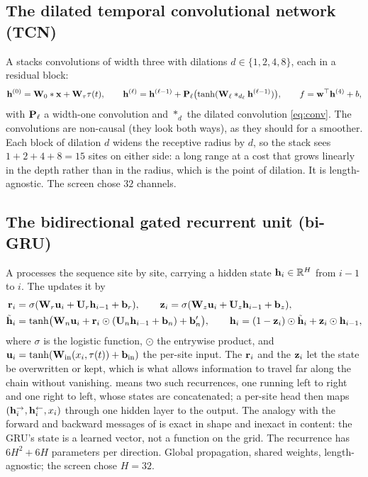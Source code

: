 \subsection{The dilated temporal convolutional network (TCN)}

A  stacks convolutions of width three with
dilations $d\in\{1,2,4,8\}$, each in a residual block:
\begin{equation}
  \mathbf{h}^{(0)}=\mathbf{W}_0\ast\mathbf{x}+\mathbf{W}_\tau\tau(t),\qquad
  \mathbf{h}^{(\ell)}=\mathbf{h}^{(\ell-1)}+\mathbf{P}_\ell\bigl(\tanh(\mathbf{W}_\ell\ast_{d_\ell}\mathbf{h}^{(\ell-1)})\bigr),\qquad
  f=\mathbf{w}^\top\mathbf{h}^{(4)}+b,
\end{equation}
with $\mathbf{P}_\ell$ a width-one convolution and $\ast_{d}$ the dilated convolution
\cref{eq:conv}. The convolutions are non-causal (they look both ways), as they should
for a smoother. Each block of dilation $d$ widens the receptive radius by $d$, so the
stack sees $1+2+4+8=15$ sites on either side: a long range at a cost that grows linearly
in the depth rather than in the radius, which is the point of dilation. It is
length-agnostic. The screen chose $32$ channels.

\subsection{The bidirectional gated recurrent unit (bi-GRU)}

A  processes the sequence site by site, carrying a hidden state
$\mathbf{h}_i\in\mathbb{R}^H$ from $i-1$ to $i$. The  updates it by
\begin{equation}
\begin{aligned}
  \mathbf{r}_i&=\sigma(\mathbf{W}_r\mathbf{u}_i+\mathbf{U}_r\mathbf{h}_{i-1}+\mathbf{b}_r),\qquad
  \mathbf{z}_i=\sigma(\mathbf{W}_z\mathbf{u}_i+\mathbf{U}_z\mathbf{h}_{i-1}+\mathbf{b}_z),\\
  \tilde{\mathbf{h}}_i&=\tanh\bigl(\mathbf{W}_n\mathbf{u}_i+\mathbf{r}_i\odot(\mathbf{U}_n\mathbf{h}_{i-1}+\mathbf{b}_n)+\mathbf{b}_n'\bigr),\qquad
  \mathbf{h}_i=(1-\mathbf{z}_i)\odot\tilde{\mathbf{h}}_i+\mathbf{z}_i\odot\mathbf{h}_{i-1},
\end{aligned}
\end{equation}
where $\sigma$ is the logistic function, $\odot$ the entrywise product, and
$\mathbf{u}_i=\tanh(\mathbf{W}_{\mathrm{in}}(x_i,\tau(t))+\mathbf{b}_{\mathrm{in}})$ the per-site
input. The  $\mathbf{r}_i$ and the  $\mathbf{z}_i$ let the
state be overwritten or kept, which is what allows information to travel far along the
chain without vanishing.  means two such recurrences, one running
left to right and one right to left, whose states are concatenated; a per-site head then
maps $(\mathbf{h}_i^{\rightarrow},\mathbf{h}_i^{\leftarrow},x_i)$ through one hidden layer to the
output. The analogy with the forward and backward messages of 
is exact in shape and inexact in content: the GRU's state is a learned vector, not a
function on the grid. The recurrence has $6H^2+6H$ parameters per direction. Global
propagation, shared weights, length-agnostic; the screen chose $H=32$.


